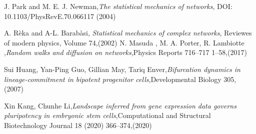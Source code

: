 \begin{thebibliography}{90}
 J. Park and M. E. J. Newman,\emph{The statistical mechanics of networks}, DOI: 10.1103/PhysRevE.70.066117 (2004)


 A. Rèka and A-L. Barabàsi, \emph{Statistical mechanics of complex networks}, Reviewes of modern physics, Volume 74,(2002)
 N. Masuda , M. A. Porter, R. Lambiotte ,\emph{Random walks and diffusion on networks},Physics Reports 716–717 1–58,(2017)


 Sui Huang, Yan-Ping Guo, Gillian May, Tariq Enver,\emph{Bifurcation dynamics in lineage-commitment in bipotent progenitor cells},Developmental Biology 305, (2007)

 Xin Kang, Chunhe Li,\emph{Landscape inferred from gene expression data governs pluripotency in
embryonic stem cells},Computational and Structural Biotechnology Journal 18 (2020) 366–374,(2020)



\end{thebibliography}
\clearpage{\pagestyle{empty}\cleardoublepage}

